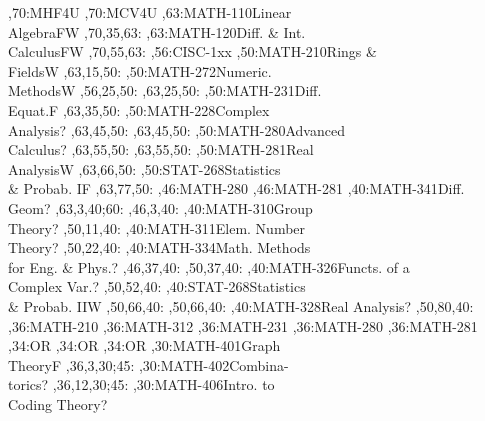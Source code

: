 \documentclass{article}
\begin{document}
\thispagestyle{empty}
\begin{chart}
,70:{MHF4U}
,70:{MCV4U}
,63:{MATH-110}{Linear\\Algebra}{FW}
  ,70,35,63:
,63:{MATH-120}{Diff. \& Int.\\Calculus}{FW}
  ,70,55,63:
,56:{CISC-1xx}
,50:{MATH-210}{Rings \&\\Fields}{W}
  ,63,15,50:
,50:{MATH-272}{Numeric.\\Methods}{W}
  ,56,25,50:
  ,63,25,50:
,50:{MATH-231}{Diff.\\Equat.}{F}
  ,63,35,50:
,50:{MATH-228}{Complex\\Analysis}{?}
  ,63,45,50:
  ,63,45,50:
,50:{MATH-280}{Advanced\\Calculus}{?}
  ,63,55,50:
  ,63,55,50:
,50:{MATH-281}{Real\\Analysis}{W}
  ,63,66,50:
,50:{STAT-268}{Statistics\\\& Probab. I}{F}
  ,63,77,50:
,46:{MATH-280}
,46:{MATH-281}
,40:{MATH-341}{Diff.\\Geom}{?}
  ,63,3,40;60:
  ,46,3,40:
,40:{MATH-310}{Group\\Theory}{?}
  ,50,11,40:
,40:{MATH-311}{Elem. Number\\Theory}{?}
  ,50,22,40:
,40:{MATH-334}{Math. Methods\\for Eng. \& Phys.}{?}
  ,46,37,40:
  ,50,37,40:
,40:{MATH-326}{Functs. of a\\Complex Var.}{?}
  ,50,52,40:
,40:{STAT-268}{Statistics\\\& Probab. II}{W}
  ,50,66,40:
  ,50,66,40:
,40:{MATH-328}{Real Analysis}{?}
  ,50,80,40:
,36:{MATH-210}
,36:{MATH-312}
,36:{MATH-231}
,36:{MATH-280}
,36:{MATH-281}
,34:{OR}
,34:{OR}
,34:{OR}
,30:{MATH-401}{Graph\\Theory}{F}
  ,36,3,30;45:
,30:{MATH-402}{Combina-\\torics}{?}
  ,36,12,30;45:
,30:{MATH-406}{Intro. to\\Coding Theory}{?}

\end{chart}
\end{document}

